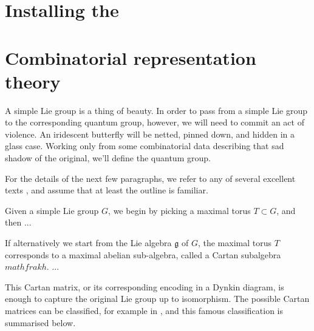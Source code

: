 
\section{Installing the \pkg}

\section{Combinatorial representation theory}
A simple Lie group is a thing of beauty. In order to pass from a simple Lie group to the corresponding quantum group, however, we will need to commit
an act of violence. An iridescent butterfly will be netted, pinned down, and hidden in a glass case. Working only from some combinatorial data
describing that sad shadow of the original, we'll define the quantum group.

For the details of the next few paragraphs, we refer to any of several excellent texts \cite{?,?,?}, and assume that at least the outline is familiar.

Given a simple Lie group $G$, we begin by picking a maximal torus $T \subset G$, and then ...

If alternatively we start from the Lie algebra $\mathfrak{g}$ of $G$, the maximal torus $T$ corresponds to a maximal abelian sub-algebra, called a Cartan
subalgebra $mathfrak{h}$. ...

This Cartan matrix, or its corresponding encoding in a Dynkin diagram, is enough to capture the original Lie group up to isomorphism. The possible
Cartan matrices can be classified, for example in \cite{humphreys}, and this famous classification is summarised below.

